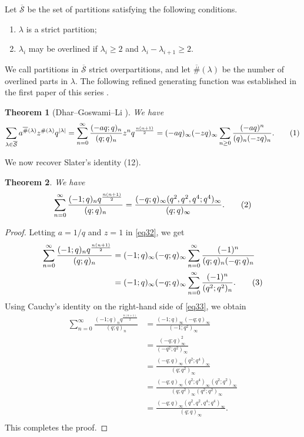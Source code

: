 \documentclass[11pt]{amsart}
\newtheorem{theorem}{Theorem}[section]
\theoremstyle{definition}
\theoremstyle{remark}
\numberwithin{equation}{section}
\newcommand\numberthis{\addtocounter{equation}{1}\tag{\theequation}}
\begin{document}
Let $\overline{\mathcal{S}}$ be the set of partitions satisfying the following conditions.
\begin{enumerate}
    \item $\lambda$ is a strict partition;
    \item $\lambda_i$ may be overlined if $\lambda_{i}\geq2$ and $\lambda_{i}-\lambda_{i+1}\geq2$.
\end{enumerate}
We call partitions in $\overline{\mathcal{S}}$ strict overpartitions, and let $\overline{\#}(\lambda)$ be the number of overlined parts in $\lambda$. The following refined generating function was established in the first paper of this series \cite{DGLSIPI}.
\begin{theorem}[Dhar--Goswami--Li \cite{DGLSIPI}]\label{thm:GFStrictOverpartition}We have
\begin{align*}
\sum_{\lambda\in\overline{\mathcal{S}}}a^{\overline{\#}(\lambda)}z^{\#(\lambda)}q^{|\lambda|}=\sum_{n=0}^{\infty}\frac{(-aq;q)_{n}}{(q;q)_{n}}z^nq^{\frac{n(n+1)}{2}}=(-aq)_\infty (-zq)_\infty\sum_{n\ge 0}\dfrac{(-aq)^n}{(q)_n(-zq)_n}.\numberthis\label{eq31}
\end{align*}
\end{theorem}
We now recover Slater's identity (12).
\begin{theorem}\label{thm:Slater12} We have
\begin{align*}
\sum\limits_{n=0}^{\infty}\frac{(-1;q)_nq^{\frac{n(n+1)}{2}}}{(q;q)_n}=\frac{(-q;q)_{\infty}(q^2,q^2,q^4;q^4)_{\infty}}{(q;q)_{\infty}}.\numberthis\label{eq32}
\end{align*}
\end{theorem}
\begin{proof}
Letting $a=1/q$ and $z=1$ in \eqref{eq32}, we get
\begin{align*}
\sum\limits_{n=0}^{\infty}\frac{(-1;q)_nq^{\frac{n(n+1)}{2}}}{(q;q)_n} &= (-1;q)_{\infty}(-q;q)_{\infty}\sum\limits_{n=0}^{\infty}\frac{(-1)^n}{(q;q)_n(-q;q)_n}\\
&= (-1;q)_{\infty}(-q;q)_{\infty}\sum\limits_{n=0}^{\infty}\frac{(-1)^n}{(q^2;q^2)_n}.\numberthis\label{eq33}
\end{align*}
Using Cauchy's identity \cite[p. $17$, $(2.2.1)$]{A} on the right-hand side of \eqref{eq33}, we obtain
\begin{align*}
\sum\limits_{n=0}^{\infty}\frac{(-1;q)_nq^{\frac{n(n+1)}{2}}}{(q;q)_n} &= \frac{(-1;q)_{\infty}(-q;q)_{\infty}}{(-1;q^2)_{\infty}}\\
&= \frac{(-q;q)^2_{\infty}}{(-q^2;q^2)_{\infty}}\\
&= \frac{(-q;q)_{\infty}(q^2;q^4)_{\infty}}{(q;q^2)_{\infty}}\\
&= \frac{(-q;q)_{\infty}(q^2;q^4)_{\infty}(q^2;q^2)_{\infty}}{(q;q^2)_{\infty}(q^2;q^2)_{\infty}}\\
&= \frac{(-q;q)_{\infty}(q^2,q^2,q^4;q^4)_{\infty}}{(q;q)_{\infty}}.\\
\end{align*}
This completes the proof.
\end{proof}
\end{document}
